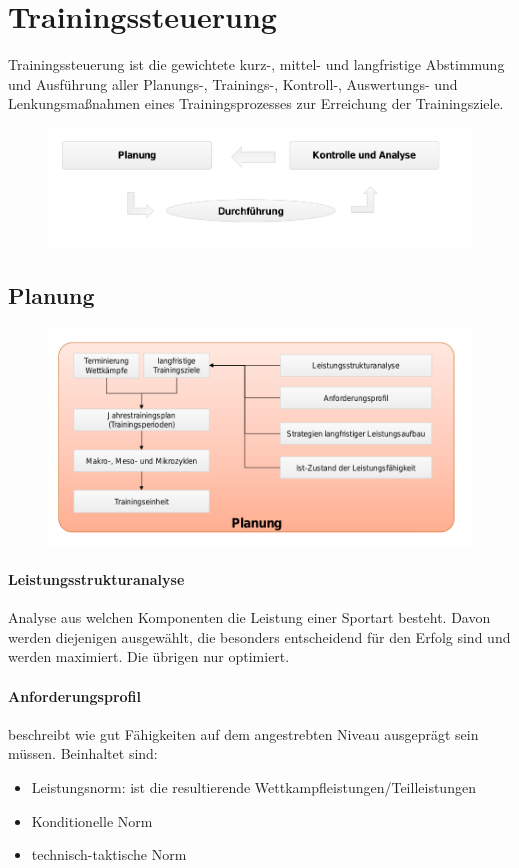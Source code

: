 \section{Trainingssteuerung}
Trainingssteuerung ist die gewichtete kurz-, mittel- und langfristige Abstimmung und Ausführung aller Planungs-, Trainings-, Kontroll-, Auswertungs- und Lenkungsmaßnahmen eines Trainingsprozesses zur Erreichung der Trainingsziele.
\begin{figure}[H]
  \centering
  \includegraphics[width=.7\textwidth]{pictures/trainingssteuerung_komponenten.png}
\end{figure}

\subsection{Planung}
\begin{figure}[H]
  \centering
  \includegraphics[width=.7\textwidth]{pictures/trainingsplanung_komponenten.png}
\end{figure}
\paragraph{Leistungsstrukturanalyse} Analyse aus welchen Komponenten die Leistung einer Sportart besteht.
Davon werden diejenigen ausgewählt, die besonders entscheidend für den Erfolg sind und werden maximiert.
Die übrigen nur optimiert.\\
\paragraph{Anforderungsprofil} beschreibt wie gut Fähigkeiten auf dem angestrebten Niveau ausgeprägt sein müssen.
Beinhaltet sind:
\begin{itemize}
  \item Leistungsnorm: ist die resultierende Wettkampfleistungen/Teilleistungen
  \item Konditionelle Norm
  \item technisch-taktische Norm
\end{itemize}
